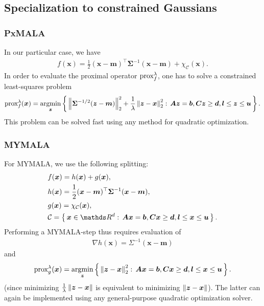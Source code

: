 \documentclass[10pt]{article}
\numberwithin{equation}{section}
\begin{document}
\subsection{Specialization to constrained Gaussians}

\subsubsection{PxMALA}

In our particular case, we have
\begin{align*}
f(\bm x) = \frac{1}{2}(\bm x - \bm m)^\top \bm \Sigma^{-1} (\bm x - \bm m) + \chi_{\mathcal C}(\bm x).
\end{align*}
In order to evaluate the proximal operator $\text{prox}_{f}^{\lambda}$, one has to solve a constrained least-squares problem
\begin{align*}
\text{prox}_{f}^{\lambda}(\bm x) = \operatorname*{argmin}_{\bm z} \left\{\,\left\|\bm \Sigma^{-1/2}(\bm z - \bm m)\right\|_2^2 + \frac{1}{\lambda} \left\|\bm z - \bm x\right\|_2^2:\, \bm A \bm z = \bm b, \bm C \bm z \geq \bm d, \bm l \leq \bm z \leq \bm u\,\right\}.
\end{align*}
This problem can be solved fast using any method for quadratic optimization.

\subsubsection{MYMALA}

For MYMALA, we use the following splitting:
\begin{align*}
& f(\bm x) = h(\bm x) + g(\bm x), \\
& h(\bm x) = \frac{1}{2} (\bm x - \bm m)^\top \bm \Sigma^{-1} (\bm x - \bm m), \\
& g(\bm x) = \chi_{\mathcal C}(\bm x), \\
& \mathcal C = \Set{\bm x \in \R^d}{\bm A \bm x = \bm b, \bm C \bm x \geq \bm d, \bm l \leq \bm x \leq \bm u}.
\end{align*}
Performing a MYMALA-step thus requires evaluation of
\begin{align*}
\nabla h(\bm x) = \Sigma^{-1}(\bm x - \bm m)
\end{align*}
and
\begin{align*}
\text{prox}_{g}^{\lambda}(\bm x) = \operatorname*{argmin}_{\bm z} \left\{\,\left\|\bm z - \bm x\right\|_2^2:\, \bm A \bm x = \bm b, \bm C \bm x \geq \bm d, \bm l \leq \bm x \leq \bm u\,\right\}.
\end{align*}
(since minimizing $\frac{1}{\lambda} \left\|\bm z - \bm x\right\|$ is equivalent to minimizing $\left\|\bm z - \bm x\right\|$). The latter can again be implemented using any general-purpose quadratic optimization solver.
\end{document}
